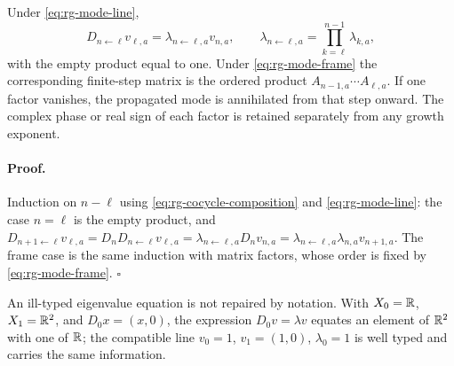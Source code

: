 Under \eqref{eq:rg-mode-line},
\begin{equation}
D_{n\leftarrow\ell}v_{\ell,a}=\lambda_{n\leftarrow\ell,a}v_{n,a},
\qquad
\lambda_{n\leftarrow\ell,a}=\prod_{k=\ell}^{n-1}\lambda_{k,a},
\label{eq:rg-mode-product}
\end{equation}
with the empty product equal to one. Under \eqref{eq:rg-mode-frame} the
corresponding finite-step matrix is the ordered product
\(A_{n-1,a}\cdots A_{\ell,a}\). If one factor vanishes, the propagated mode is
annihilated from that step onward. The complex phase or real sign of each
factor is retained separately from any growth exponent. 

\paragraph{Proof.}
Induction on \(n-\ell\) using \eqref{eq:rg-cocycle-composition} and
\eqref{eq:rg-mode-line}: the case \(n=\ell\) is the empty product, and
\(D_{n+1\leftarrow\ell}v_{\ell,a}=D_nD_{n\leftarrow\ell}v_{\ell,a}
=\lambda_{n\leftarrow\ell,a}D_nv_{n,a}
=\lambda_{n\leftarrow\ell,a}\lambda_{n,a}v_{n+1,a}\). The frame case is the same
induction with matrix factors, whose order is fixed by
\eqref{eq:rg-mode-frame}. \(\square\)

An ill-typed eigenvalue equation is not repaired by notation. With
\(X_0=\mathbb R\), \(X_1=\mathbb R^2\), and \(D_0x=(x,0)\), the expression \(D_0v=\lambda v\)
equates an element of \(\mathbb R^2\) with one of \(\mathbb R\); the compatible line
\(v_0=1\), \(v_1=(1,0)\), \(\lambda_0=1\) is well typed and carries the same
information. 

